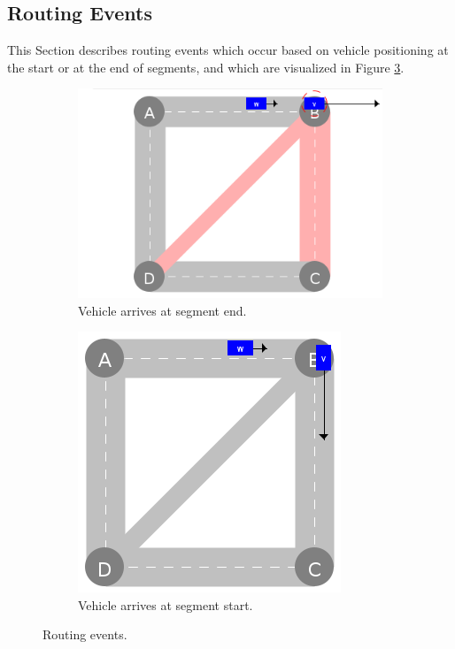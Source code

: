 \documentclass[graybox]{svmult}
\begin{document}
\subsection{Routing Events}
\label{sec:routing-events}
This Section describes routing events which occur based on vehicle positioning at the start or at the end of segments, and which are visualized in Figure \ref{fig:routing-events}.
\vspace{4mm}
\begin{figure}
	\centering
	\begin{subfigure}{.45\textwidth}
		\centering
		\includegraphics[scale=0.35]{../../events/vehicle-at-intersection-before.png}
		\caption{Vehicle arrives at segment end.}
		\label{fig:vehicle-at-intersection-before}
	\end{subfigure}
	\begin{subfigure}{.45\textwidth}
		\centering
		\includegraphics[scale=0.35]{../../events/vehicle-at-intersection-after.png}
		\caption{Vehicle arrives at segment start.}
		\label{fig:vehicle-at-intersection-after}
	\end{subfigure}
	\caption{Routing events.}
		\label{fig:routing-events}
\end{figure}
\end{document}
